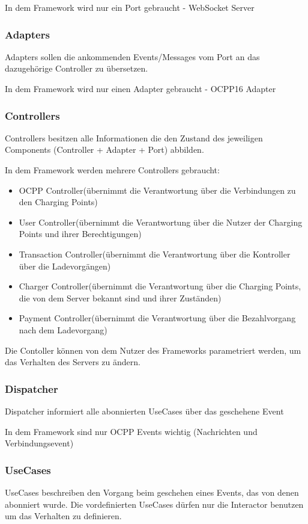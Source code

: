         In dem Framework wird nur ein Port gebraucht - WebSocket Server
        \subsubsection{Adapters}
        Adapters sollen die ankommenden Events/Messages vom Port an das dazugehörige Controller zu übersetzen.

        In dem Framework wird nur einen Adapter gebraucht - OCPP16 Adapter
        \subsubsection{Controllers}
        Controllers besitzen alle Informationen die den Zustand des jeweiligen Components (Controller + Adapter + Port) abbilden.

        In dem Framework werden mehrere Controllers gebraucht:
        \begin{itemize}
            \item OCPP Controller(übernimmt die Verantwortung über die Verbindungen zu den Charging Points)
            \item User Controller(übernimmt die Verantwortung über die Nutzer der Charging Points und ihrer Berechtigungen)
            \item Transaction Controller(übernimmt die Verantwortung über die Kontroller über die Ladevorgängen)
            \item Charger Controller(übernimmt die Verantwortung über die Charging Points, die von dem Server bekannt sind und ihrer Zuständen)
            \item Payment Controller(übernimmt die Verantwortung über die Bezahlvorgang nach dem Ladevorgang)
        \end{itemize}

        Die Contoller können von dem Nutzer des Frameworks parametriert werden, um das Verhalten des Servers zu ändern.
        \subsubsection{Dispatcher}
        Dispatcher informiert alle abonnierten UseCases über das geschehene Event

        In dem Framework sind nur OCPP Events wichtig (Nachrichten und Verbindungsevent)
        \subsubsection{UseCases}
        UseCases beschreiben den Vorgang beim geschehen eines Events, das von denen abonniert wurde.
        Die vordefinierten UseCases dürfen nur die Interactor benutzen um das Verhalten zu definieren.

